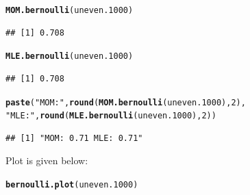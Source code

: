 \documentclass{article}\usepackage[]{graphicx}\usepackage[]{color}
\makeatletter
\newcommand{\hlnum}[1]{\textcolor[rgb]{0.686,0.059,0.569}{#1}}%
\newcommand{\hlstr}[1]{\textcolor[rgb]{0.192,0.494,0.8}{#1}}%
\newcommand{\hlstd}[1]{\textcolor[rgb]{0.345,0.345,0.345}{#1}}%
\newcommand{\hlkwd}[1]{\textcolor[rgb]{0.737,0.353,0.396}{\textbf{#1}}}%
\newenvironment{kframe}{%
 \def\at@end@of@kframe{}%
 \ifinner\ifhmode%
  \def\at@end@of@kframe{\end{minipage}}%
  \begin{minipage}{\columnwidth}%
 \fi\fi%
 \def\FrameCommand##1{\hskip\@totalleftmargin \hskip-\fboxsep
 \colorbox{shadecolor}{##1}\hskip-\fboxsep
     \hskip-\linewidth \hskip-\@totalleftmargin \hskip\columnwidth}%
 \MakeFramed {\advance\hsize-\width
   \@totalleftmargin\z@ \linewidth\hsize
   \@setminipage}}%
 {\par\unskip\endMakeFramed%
 \at@end@of@kframe}
\newenvironment{knitrout}{}{} %
\makeatother
\begin{document}
\begin{enumerate}
\begin{enumerate}
\begin{knitrout}
\begin{kframe}
\begin{alltt}
\hlkwd{MOM.bernoulli}\hlstd{(uneven.1000)}
\end{alltt}
\begin{verbatim}
## [1] 0.708
\end{verbatim}
\begin{alltt}
\hlkwd{MLE.bernoulli}\hlstd{(uneven.1000)}
\end{alltt}
\begin{verbatim}
## [1] 0.708
\end{verbatim}
\begin{alltt}
\hlkwd{paste}\hlstd{(}\hlstr{"MOM:"}\hlstd{,} \hlkwd{round}\hlstd{(}\hlkwd{MOM.bernoulli}\hlstd{(uneven.1000),}\hlnum{2}\hlstd{),}
      \hlstr{"MLE:"}\hlstd{,} \hlkwd{round}\hlstd{(}\hlkwd{MLE.bernoulli}\hlstd{(uneven.1000),} \hlnum{2}\hlstd{))}
\end{alltt}
\begin{verbatim}
## [1] "MOM: 0.71 MLE: 0.71"
\end{verbatim}
\end{kframe}
\end{knitrout}
Plot is given below:
\begin{knitrout}
\color{fgcolor}\begin{kframe}
\begin{alltt}
\hlkwd{bernoulli.plot}\hlstd{(uneven.1000)}
\end{alltt}
\end{kframe}
\end{knitrout}


\end{enumerate}
\end{enumerate}
\end{document}

